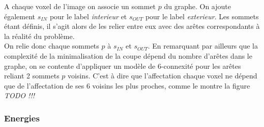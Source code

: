 \documentclass{article}
\begin{document}
A chaque voxel de l'image on associe un sommet $p$ du graphe. On ajoute également $s_{IN}$ pour le label \textit{interieur} et $s_{OUT}$ pour le label \textit{exterieur}. Les sommets étant définis, il s'agit alors de les relier entre eux avec des arêtes correspondants à la réalité du problème.\\
On relie donc chaque sommets $p$ à $s_{IN}$ et $s_{OUT}$. En remarquant par ailleurs que la complexité de la minimalisation de la coupe dépend du nombre d'arêtes dans le graphe, on se contente d'appliquer un modèle de 6-connexité pour les arêtes reliant 2 sommets $p$ voisins. C'est à dire que l'affectation chaque voxel ne dépend que de l'affectation de ses 6 voisins les plus proches, comme le montre la figure \textit{TODO !!!}

\subsubsection{Energies}
\end{document}
